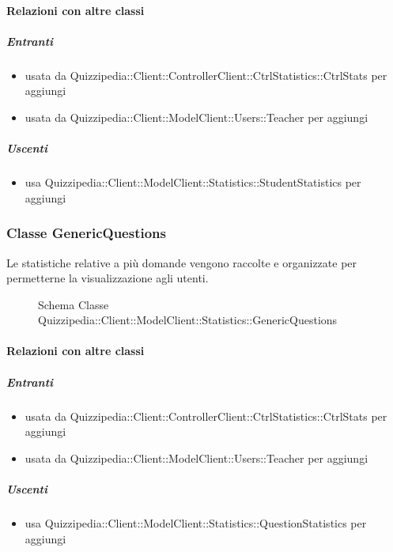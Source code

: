\paragraph{Relazioni con altre classi}
\subparagraph{Entranti}
\begin{itemize}
\item usata da Quizzipedia::Client::ControllerClient::CtrlStatistics::CtrlStats per aggiungi
\item usata da Quizzipedia::Client::ModelClient::Users::Teacher per aggiungi
\end{itemize}
\subparagraph{Uscenti}
\begin{itemize}
\item usa Quizzipedia::Client::ModelClient::Statistics::StudentStatistics per aggiungi
\end{itemize}
\subsubsection{Classe GenericQuestions}
Le statistiche relative a più domande vengono raccolte e organizzate per permetterne la visualizzazione agli utenti.
\begin{figure}[H]
\centering
\noindent{}
\caption[Schema Classe GenericQuestions]{Schema Classe Quizzipedia::Client::ModelClient::Statistics::GenericQuestions}
\end{figure}
\paragraph{Relazioni con altre classi}
\subparagraph{Entranti}
\begin{itemize}
\item usata da Quizzipedia::Client::ControllerClient::CtrlStatistics::CtrlStats per aggiungi
\item usata da Quizzipedia::Client::ModelClient::Users::Teacher per aggiungi
\end{itemize}
\subparagraph{Uscenti}
\begin{itemize}
\item usa Quizzipedia::Client::ModelClient::Statistics::QuestionStatistics per aggiungi
\end{itemize}
